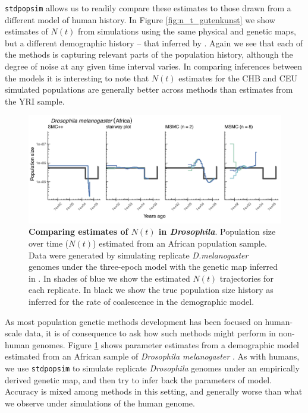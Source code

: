 \documentclass[12pt,halfline,a4paper]{ouparticle}
\newcommand{\stdpopsim}{\texttt{stdpopsim}\xspace}
\begin{document}
\stdpopsim allows us to readily compare these estimates to those drawn from a different
model of human history. In Figure \ref{fig:n_t_gutenkunst} we show estimates of
$N(t)$ from simulations using the same physical and genetic maps, but a different demographic
history -- that inferred by \cite{gutenkunst2009inferring}. Again we see that each
of the methods is capturing relevant parts of the population history, although the
degree of noise at any given time interval varies. In comparing inferences between the
models it is interesting to note that $N(t)$ estimates for the CHB and CEU
simulated populations are generally better across methods than estimates from the YRI
sample.


\begin{figure}
\begin{center}
\includegraphics[width=0.8\linewidth]{display_items/d_mel_Sheehan_mask2.png}
\caption{\textbf{Comparing estimates of $N(t)$ in \emph{Drosophila}}. Population
size over time ($N(t)$) estimated from an African population sample. Data were generated by simulating
replicate \emph{D.melanogaster} genomes under the three-epoch \cite{sheehan2016deep} model
with the genetic map inferred in \cite{comeron2012many}. In shades of blue we show the estimated
$N(t)$ trajectories for each replicate. In black we show the true population size history as inferred
for the rate of coalescence in the demographic model.}
\label{fig:n_t_sheehan}
\end{center}
\end{figure}

As most population genetic methods development has been focused on human-scale
data, it is of consequence to ask how such methods might perform in non-human
genomes. Figure \ref{fig:n_t_sheehan} shows parameter estimates from a demographic
model estimated from an African sample of \emph{Drosophila melanogaster} \citep{sheehan2016deep}.
As with humans, we use \stdpopsim to simulate replicate \emph{Drosophila} genomes under
an empirically derived genetic map, and then try to infer back the parameters of model.
Accuracy is mixed among methods in this setting, and generally worse than what we
observe under simulations of the human genome.
\end{document}
